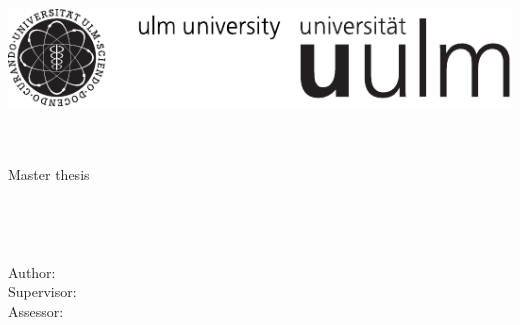 
\thispagestyle{empty}

\begin{titlepage}

	

\includegraphics[width=\textwidth]{image/logo.pdf}\\[10em]

\noindent\textbf{\Large\doctitle}\\[1em]
\noindent\Large\docsubtitle\\

\vfill

\normalsize

\noindent Master thesis\\
\docID\\[.75em]
\noindent\university\\
\faculty\\
\institute\\[.75em]
\noindent Author: \docauthor\\
\noindent Supervisor: \docsupervisor\\
\noindent Assessor: \docassessor\\

\end{titlepage}

\restoregeometry